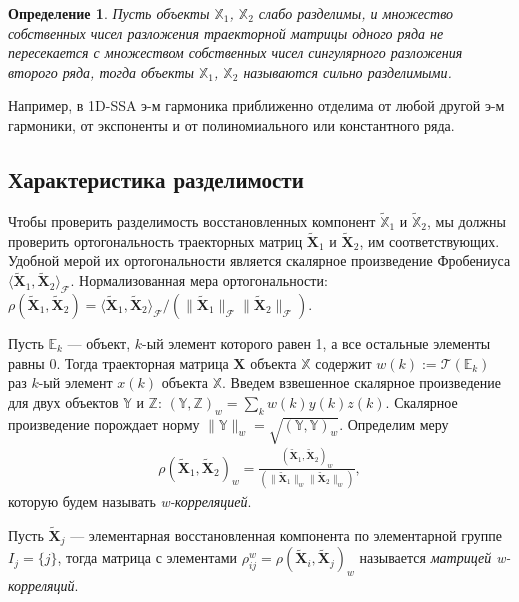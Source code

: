 \documentclass[specialist,
               substylefile = spbu.rtx,
               subf,href,colorlinks=true, 12pt]{disser}
\newtheorem{defn}{Определение}
\begin{document}
\begin{defn}
Пусть объекты $\mathbb{X}_1$,  $\mathbb{X}_2$ слабо разделимы, и множество собственных чисел разложения
 траекторной матрицы одного ряда не пересекается с множеством собственных чисел сингулярного разложения второго ряда,
 тогда объекты $\mathbb{X}_1$,  $\mathbb{X}_2$ называются \emph{сильно разделимыми}.
\end{defn}

Например, в 1D-SSA э-м гармоника приближенно отделима от любой другой э-м гармоники, от экспоненты и от полиномиального или константного ряда.

\subsection{Характеристика разделимости}
\label{sec:sep}
Чтобы проверить разделимость восстановленных компонент $\widetilde{\mathbb{X}}_1$ и $\widetilde{\mathbb{X}}_2$, мы должны проверить ортогональность траекторных матриц $\widetilde{\mathbf{X}}_{1}$ и $\widetilde{\mathbf{X}}_{2}$, им соответствующих. Удобной мерой их ортогональности является скалярное произведение Фробениуса $\langle \widetilde{\mathbf{X}}_{1}, \widetilde{\mathbf{X}}_{2}\rangle_\mathcal{F}$. Нормализованная мера ортогональности: $\rho(\widetilde{\mathbf{X}}_{1}, \widetilde{\mathbf{X}}_{2}) = \langle \widetilde{\mathbf{X}}_{1}, \widetilde{\mathbf{X}}_{2}\rangle_\mathcal{F}/ \left( \| \widetilde{\mathbf{X}}_{1} \|_{\mathcal{F}} \|\widetilde{\mathbf{X}}_{2}\|_{\mathcal{F}} \right)$.

Пусть $\mathbb{E}_k$ --- объект, $k$-ый элемент которого равен 1, а все остальные элементы равны 0. Тогда траекторная матрица $\mathbf{X}$ объекта $\mathbb{X}$ содержит $w(k) := \mathcal{T}(\mathbb{E}_k)$ раз $k$-ый элемент $x(k)$ объекта $\mathbb{X}$. Введем взвешенное скалярное произведение для двух объектов $\mathbb{Y}$ и $\mathbb{Z}$: $(\mathbb{Y}, \mathbb{Z})_w = \sum_k w(k) y(k) z(k)$. Скалярное произведение порождает норму $\|\mathbb{Y}\|_w=\sqrt{(\mathbb{Y}, \mathbb{Y})_w}$. Определим меру
\begin{gather*}
\rho(\widetilde{\mathbf{X}}_{1}, \widetilde{\mathbf{X}}_{2})_w = \frac{\left( \widetilde{\mathbf{X}}_{1}, \widetilde{\mathbf{X}}_{2}\right)_w }{\left( \| \widetilde{\mathbf{X}}_{1} \|_w \|\widetilde{\mathbf{X}}_{2}\|_w \right)},
\end{gather*}
которую будем называть \textit{w-корреляцией}.

Пусть $ \widetilde{\mathbf{X}}_{j}$ --- элементарная восстановленная компонента по элементарной группе $I_j = \{j\}$, тогда матрица с элементами $\rho_{ij}^{w} = \rho(\widetilde{\mathbf{X}}_{i}, \widetilde{\mathbf{X}}_{j})_w$ называется \textit{матрицей w-корреляций}.
\end{document}
